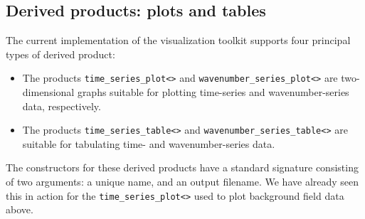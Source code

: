 \documentclass[11pt,a4paper]{article}
\begin{document}
\subsection{Derived products: plots and tables}
The current implementation of the visualization toolkit supports four principal
types of derived product:
\begin{itemize}
	\item The products \texttt{time_series_plot<>}
	and \texttt{wavenumber_series_plot<>}
	are two-dimensional graphs
	suitable for plotting time-series and wavenumber-series
	data, respectively.
	
	\item The products \texttt{time_series_table<>}
	and \texttt{wavenumber_series_table<>}
	are suitable for tabulating time- and wavenumber-series data.
\end{itemize}
The constructors for these derived products have a standard signature
consisting of two arguments:
a unique name, and an output filename.
We have already seen this in action for the
\texttt{time_series_plot<>} used to plot background field data
above.
\end{document}

